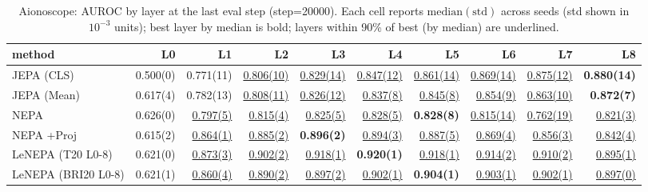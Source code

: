 \begin{table}[t]
\centering
\scriptsize
\caption{Aionoscope: AUROC by layer at the last eval step (step=20000). Each cell reports $\mathrm{median}(\mathrm{std})$ across seeds (std shown in $10^{-3}$ units); best layer by median is bold; layers within 90\% of best (by median) are underlined.}
\label{tab:aiono_last_step_by_layer_auroc}
\begin{tabular}{lrrrrrrrrr}
\toprule
method & L0 & L1 & L2 & L3 & L4 & L5 & L6 & L7 & L8 \\
\midrule
JEPA (CLS) & 0.500(0) & 0.771(11) & \underline{0.806(10)} & \underline{0.829(14)} & \underline{0.847(12)} & \underline{0.861(14)} & \underline{0.869(14)} & \underline{0.875(12)} & \textbf{0.880(14)} \\
JEPA (Mean) & 0.617(4) & 0.782(13) & \underline{0.808(11)} & \underline{0.826(12)} & \underline{0.837(8)} & \underline{0.845(8)} & \underline{0.854(9)} & \underline{0.863(10)} & \textbf{0.872(7)} \\
NEPA & 0.626(0) & \underline{0.797(5)} & \underline{0.815(4)} & \underline{0.825(5)} & \underline{0.828(5)} & \textbf{0.828(8)} & \underline{0.815(14)} & \underline{0.762(19)} & \underline{0.821(3)} \\
NEPA +Proj & 0.615(2) & \underline{0.864(1)} & \underline{0.885(2)} & \textbf{0.896(2)} & \underline{0.894(3)} & \underline{0.887(5)} & \underline{0.869(4)} & \underline{0.856(3)} & \underline{0.842(4)} \\
LeNEPA (T20 L0-8) & 0.621(0) & \underline{0.873(3)} & \underline{0.902(2)} & \underline{0.918(1)} & \textbf{0.920(1)} & \underline{0.918(1)} & \underline{0.914(2)} & \underline{0.910(2)} & \underline{0.895(1)} \\
LeNEPA (BRI20 L0-8) & 0.621(1) & \underline{0.860(4)} & \underline{0.890(2)} & \underline{0.897(2)} & \underline{0.902(1)} & \textbf{0.904(1)} & \underline{0.903(1)} & \underline{0.902(1)} & \underline{0.897(0)} \\
\bottomrule
\end{tabular}
\end{table}
